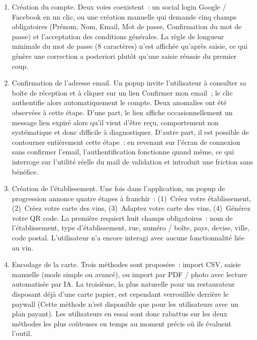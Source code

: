 \documentclass[12pt, a4paper]{article}
\begin{document}
\begin{enumerate}[leftmargin=1.5em]
  \item Création du compte. Deux voies coexistent~: un social login
        Google / Facebook en un clic, ou une création manuelle qui demande cinq champs obligatoires
        (Prénom, Nom, Email, Mot de passe, Confirmation du mot de passe) et l'acceptation des
        conditions générales. La règle de longueur minimale du mot de passe (8 caractères) n'est
        affichée qu'après saisie, ce qui génère une correction a posteriori plutôt qu'une
        saisie réussie du premier coup.

  \item Confirmation de l'adresse email. Un popup invite l'utilisateur à
        consulter sa boîte de réception et à cliquer sur un lien \og{}Confirmer mon email\fg{}~;
        le clic authentifie alors automatiquement le compte. Deux anomalies ont été observées
        à cette étape. D'une part, le lien affiche occasionnellement un message \og{}lien
        expiré\fg{} alors qu'il vient d'être reçu, comportement non systématique et donc
        difficile à diagnostiquer. D'autre part, il est possible de
        contourner entièrement cette étape~: en revenant sur l'écran de connexion sans
        confirmer l'email, l'authentification fonctionne quand même, ce qui interroge sur
        l'utilité réelle du mail de validation et introduit une friction sans bénéfice.

  \item Création de l'établissement. Une fois dans l'application, un popup
        de progression annonce quatre étapes à franchir~: (1)~\og{}Créez votre établissement\fg{},
        (2)~\og{}Créez votre carte des vins\fg{}, (3)~\og{}Adaptez votre carte des vins\fg{},
        (4)~\og{}Générez votre QR code\fg{}. La première requiert huit champs obligatoires~:
        nom de l'établissement, type d'établissement, rue, numéro / boîte, pays, devise, ville,
        code postal. L'utilisateur n'a encore interagi avec aucune fonctionnalité liée au vin.

  \item Encodage de la carte. Trois méthodes sont proposées~: import CSV, saisie
        manuelle (mode simple ou avancé), ou import par PDF / photo avec lecture automatisée
        par IA. La troisième, la plus naturelle pour un restaurateur disposant déjà d'une
        carte papier, est cependant verrouillée derrière le paywall (\og{}Cette méthode n'est
        disponible que pour les utilisateurs avec un plan payant\fg{}). Les utilisateurs en
        essai sont donc rabattus sur les deux méthodes les plus coûteuses en temps au moment
        précis où ils évaluent l'outil.


\end{enumerate}
\end{document}
